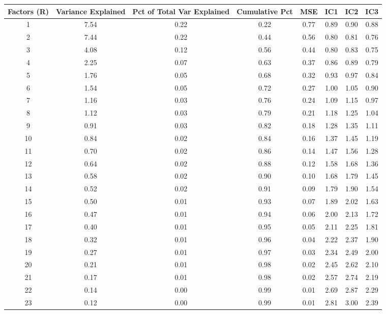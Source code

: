 \documentclass[11pt, letterpaper]{article}\usepackage[]{graphicx}\usepackage[]{color}
\begin{document}
\begin{table}[H]
\centering
\begingroup\scriptsize
\begin{tabular}{cccccccc}
  \hline
Factors (R) & Variance Explained & Pct of Total Var Explained & Cumulative Pct & MSE & IC1 & IC2 & IC3 \\ 
  \hline
  1 & 7.54 & 0.22 & 0.22 & 0.77 & 0.89 & 0.90 & 0.88 \\ 
    2 & 7.44 & 0.22 & 0.44 & 0.56 & 0.80 & 0.81 & 0.76 \\ 
    3 & 4.08 & 0.12 & 0.56 & 0.44 & 0.80 & 0.83 & 0.75 \\ 
    4 & 2.25 & 0.07 & 0.63 & 0.37 & 0.86 & 0.89 & 0.79 \\ 
    5 & 1.76 & 0.05 & 0.68 & 0.32 & 0.93 & 0.97 & 0.84 \\ 
    6 & 1.54 & 0.05 & 0.72 & 0.27 & 1.00 & 1.05 & 0.90 \\ 
    7 & 1.16 & 0.03 & 0.76 & 0.24 & 1.09 & 1.15 & 0.97 \\ 
    8 & 1.12 & 0.03 & 0.79 & 0.21 & 1.18 & 1.25 & 1.04 \\ 
    9 & 0.91 & 0.03 & 0.82 & 0.18 & 1.28 & 1.35 & 1.11 \\ 
   10 & 0.84 & 0.02 & 0.84 & 0.16 & 1.37 & 1.45 & 1.19 \\ 
   11 & 0.70 & 0.02 & 0.86 & 0.14 & 1.47 & 1.56 & 1.28 \\ 
   12 & 0.64 & 0.02 & 0.88 & 0.12 & 1.58 & 1.68 & 1.36 \\ 
   13 & 0.58 & 0.02 & 0.90 & 0.10 & 1.68 & 1.79 & 1.45 \\ 
   14 & 0.52 & 0.02 & 0.91 & 0.09 & 1.79 & 1.90 & 1.54 \\ 
   15 & 0.50 & 0.01 & 0.93 & 0.07 & 1.89 & 2.02 & 1.63 \\ 
   16 & 0.47 & 0.01 & 0.94 & 0.06 & 2.00 & 2.13 & 1.72 \\ 
   17 & 0.40 & 0.01 & 0.95 & 0.05 & 2.11 & 2.25 & 1.81 \\ 
   18 & 0.32 & 0.01 & 0.96 & 0.04 & 2.22 & 2.37 & 1.90 \\ 
   19 & 0.27 & 0.01 & 0.97 & 0.03 & 2.34 & 2.49 & 2.00 \\ 
   20 & 0.21 & 0.01 & 0.98 & 0.02 & 2.45 & 2.62 & 2.10 \\ 
   21 & 0.17 & 0.01 & 0.98 & 0.02 & 2.57 & 2.74 & 2.19 \\ 
   22 & 0.14 & 0.00 & 0.99 & 0.01 & 2.69 & 2.87 & 2.29 \\ 
   23 & 0.12 & 0.00 & 0.99 & 0.01 & 2.81 & 3.00 & 2.39 \\ 

\end{tabular}
\end{table}
\end{document}
